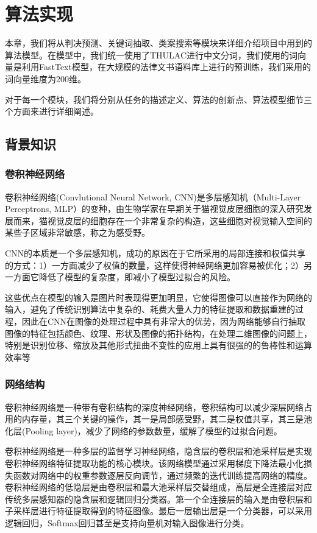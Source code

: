 \chapter{算法实现}
本章，我们将从判决预测、关键词抽取、类案搜索等模块来详细介绍项目中用到的算法模型。在模型中，我们统一使用了THULAC进行中文分词，我们使用的词向量是利用FastText模型，在大规模的法律文书语料库上进行的预训练，我们采用的词向量维度为200维。

对于每一个模块，我们将分别从任务的描述定义、算法的创新点、算法模型细节三个方面来进行详细阐述。


\section{背景知识}
\iffalse
\subsection{卷积神经网络}

卷积神经网络(Convlutional Neural Network, CNN)是多层感知机（Multi-Layer Perceptrons, MLP）的变种，由生物学家在早期关于猫视觉皮层细胞的深入研究发展而来，猫视觉皮层的细胞存在一个非常复杂的构造，这些细胞对视觉输入空间的某些子区域非常敏感，称之为感受野。

CNN的本质是一个多层感知机，成功的原因在于它所采用的局部连接和权值共享的方式：1）一方面减少了权值的数量，这样使得神经网络更加容易被优化；2）另一方面它降低了模型的复杂度，即减小了模型过拟合的风险。

这些优点在模型的输入是图片时表现得更加明显，它使得图像可以直接作为网络的输入，避免了传统识别算法中复杂的、耗费大量人力的特征提取和数据重建的过程，因此在CNN在图像的处理过程中具有非常大的优势，因为网络能够自行抽取图像的特征包括颜色、纹理、形状及图像的拓扑结构，在处理二维图像的问题上，特别是识别位移、缩放及其他形式扭曲不变性的应用上具有很强的的鲁棒性和运算效率等

\subsection{网络结构}
卷积神经网络是一种带有卷积结构的深度神经网络，卷积结构可以减少深层网络占用的内存量，其三个关键的操作，其一是局部感受野，其二是权值共享，其三是池化层(Pooling layer)，减少了网络的参数数量，缓解了模型的过拟合问题。

卷积神经网络是一种多层的监督学习神经网络，隐含层的卷积层和池采样层是实现卷积神经网络特征提取功能的核心模块。该网络模型通过采用梯度下降法最小化损失函数对网络中的权重参数逐层反向调节，通过频繁的迭代训练提高网络的精度。卷积神经网络的低隐层是由卷积层和最大池采样层交替组成，高层是全连接层对应传统多层感知器的隐含层和逻辑回归分类器。第一个全连接层的输入是由卷积层和子采样层进行特征提取得到的特征图像。最后一层输出层是一个分类器，可以采用逻辑回归，Softmax回归甚至是支持向量机对输入图像进行分类。


